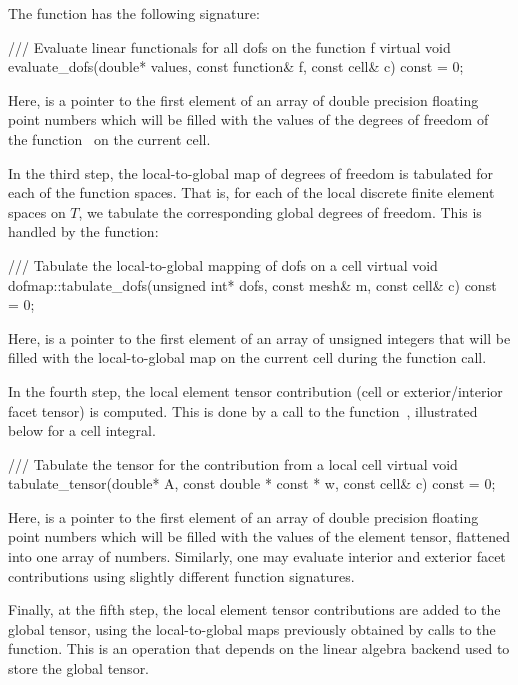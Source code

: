 \break

The  function has the following signature:
\begin{c++}
/// Evaluate linear functionals for all dofs on the function f
virtual void evaluate_dofs(double* values,
                           const function& f,
                           const cell& c) const = 0;
\end{c++}
Here,  is a pointer to the first element of an
array of double precision floating point numbers which will be filled
with the values of the degrees of freedom of the function~ on
the current cell.

In the third step, the local-to-global map of degrees of freedom is
tabulated for each of the function spaces. That is, for each of the
local discrete finite element spaces on $T$, we tabulate the
corresponding global degrees of freedom. This is handled by the
 function:

\begin{c++}
/// Tabulate the local-to-global mapping of dofs on a cell
virtual void dofmap::tabulate_dofs(unsigned int* dofs,
                                   const mesh& m,
                                   const cell& c) const = 0;
\end{c++}
Here,  is a pointer to the first element of an
array of unsigned integers that will be filled with the
local-to-global map on the current cell during the function call.

In the fourth step, the local element tensor contribution (cell or
exterior/interior facet tensor) is computed. This is done by a call to
the function~, illustrated below for a cell
integral.
\begin{c++}
/// Tabulate the tensor for the contribution from a local cell
virtual void tabulate_tensor(double* A,
                             const double * const * w,
                             const cell& c) const = 0;
\end{c++}
Here,  is a pointer to the first element of an array of
double precision floating point numbers which will be filled with the
values of the element tensor, flattened into one array of
numbers. Similarly, one may evaluate interior and exterior facet
contributions using slightly different function signatures.

Finally, at the fifth step, the local element tensor contributions are
added to the global tensor, using the local-to-global maps previously
obtained by calls to the  function. This is an
operation that depends on the linear algebra backend used to store the
global tensor.

